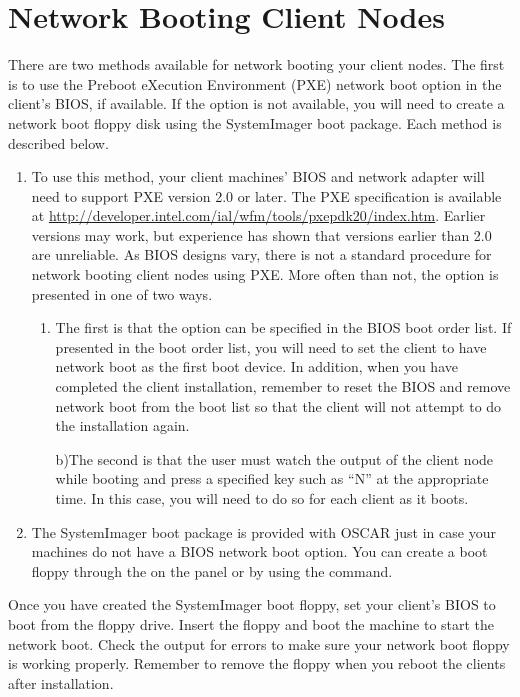 %
%
%

\section{Network Booting Client Nodes}
\label{app:net-boot-client-nodes}

There are two methods available for network booting your client nodes.
The first is to use the Preboot eXecution Environment (PXE) network
boot option in the client's BIOS, if available. If the option is not
available, you will need to create a network boot floppy disk using
the SystemImager boot package. Each method is described below.

\begin{enumerate}
\item {} To use this method, your client
  machines' BIOS and network adapter will need to support PXE version
  2.0 or later. The PXE specification is available at
  \url{http://developer.intel.com/ial/wfm/tools/pxepdk20/index.htm}.
  Earlier versions may work, but experience has shown that versions
  earlier than 2.0 are unreliable. As BIOS designs vary, there is not
  a standard procedure for network booting client nodes using PXE.
  More often than not, the option is presented in one of two ways.

  \begin{enumerate}
  \item The first is that the option can be specified in the BIOS boot
    order list. If presented in the boot order list, you will need to
    set the client to have network boot as the first boot device. In
    addition, when you have completed the client installation,
    remember to reset the BIOS and remove network boot from the boot
    list so that the client will not attempt to do the installation
    again.
    
    b)The second is that the user must watch the output of the client
    node while booting and press a specified key such as ``N'' at the
    appropriate time. In this case, you will need to do so for each
    client as it boots.
  \end{enumerate}
  
\item {} The SystemImager
  boot package is provided with OSCAR just in case your machines do not
  have a BIOS network boot option.
  You can create a boot floppy through the  on the 
   panel or by using the 
  command.
\end{enumerate}

Once you have created the SystemImager boot floppy,
set your client's BIOS to boot from the floppy
drive. Insert the floppy and boot the machine to start the network
boot. Check the output for errors to make sure your network boot
floppy is working properly. Remember to remove the floppy when you
reboot the clients after installation.
